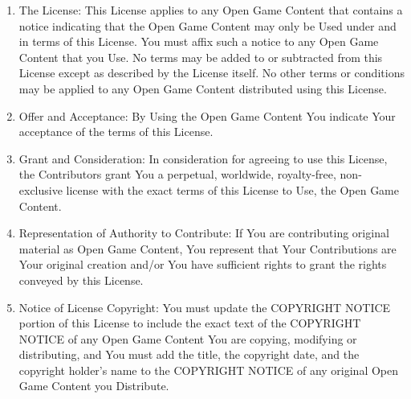 {\begin{enumerate}
\begin{enumerate}
\item
``Trademark'' means the logos, names, mark, sign, motto, designs that are used by a Contributor to identify itself or its products or the associated products contributed to the Open Game License by the Contributor.
\item
``Use'', ``Used'' or ``Using'' means to use, distribute, copy, edit, format, modify, translate and otherwise create Derivative Material of Open Game Content.
\item
``You'' or ``Your'' means the licensee in terms of this agreement.
\end{enumerate}

\item

The License: This License applies to any Open Game Content that contains a notice indicating that the Open Game Content may only be Used under and in terms of this License. You must affix such a notice to any Open Game Content that you Use. No terms may be added to or subtracted from this License except as described by the License itself. No other terms or conditions may be applied to any Open Game Content distributed using this License.

\item

Offer and Acceptance: By Using the Open Game Content You indicate Your acceptance of the terms of this License.

\item

Grant and Consideration: In consideration for agreeing to use this License, the Contributors grant You a perpetual, worldwide, royalty-free, non-exclusive license with the exact terms of this License to Use, the Open Game Content.

\item

Representation of Authority to Contribute: If You are contributing original material as Open Game Content, You represent that Your Contributions are Your original creation and/or You have sufficient rights to grant the rights conveyed by this License.

\item

Notice of License Copyright: You must update the COPYRIGHT NOTICE portion of this License to include the exact text of the COPYRIGHT NOTICE of any Open Game Content You are copying, modifying or distributing, and You must add the title, the copyright date, and the copyright holder's name to the COPYRIGHT NOTICE of any original Open Game Content you Distribute.


\end{enumerate}}
